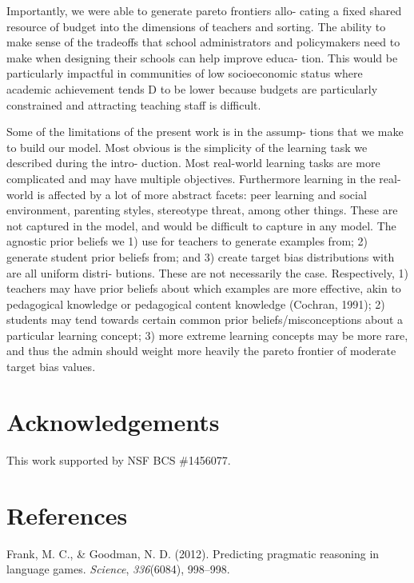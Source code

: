 \documentclass[10pt, letterpaper]{article}
\begin{document}
Importantly, we were able to generate pareto frontiers allo- cating a
fixed shared resource of budget into the dimensions of teachers and
sorting. The ability to make sense of the tradeoffs that school
administrators and policymakers need to make when designing their
schools can help improve educa- tion. This would be particularly
impactful in communities of low socioeconomic status where academic
achievement tends D to be lower because budgets are particularly
constrained and attracting teaching staff is difficult.

Some of the limitations of the present work is in the assump- tions that
we make to build our model. Most obvious is the simplicity of the
learning task we described during the intro- duction. Most real-world
learning tasks are more complicated and may have multiple objectives.
Furthermore learning in the real-world is affected by a lot of more
abstract facets: peer learning and social environment, parenting styles,
stereotype threat, among other things. These are not captured in the
model, and would be difficult to capture in any model. The agnostic
prior beliefs we 1) use for teachers to generate examples from; 2)
generate student prior beliefs from; and 3) create target bias
distributions with are all uniform distri- butions. These are not
necessarily the case. Respectively, 1) teachers may have prior beliefs
about which examples are more effective, akin to pedagogical knowledge
or pedagogical content knowledge (Cochran, 1991); 2) students may tend
towards certain common prior beliefs/misconceptions about a particular
learning concept; 3) more extreme learning concepts may be more rare,
and thus the admin should weight more heavily the pareto frontier of
moderate target bias values.

\section{Acknowledgements}\label{acknowledgements}

This work supported by NSF BCS \#1456077.

\section{References}\label{references}

\setlength{\parindent}{-0.1in} \setlength{\leftskip}{0.125in} \noindent

\hypertarget{refs}{}
\hypertarget{ref-frank2012}{}
Frank, M. C., \& Goodman, N. D. (2012). Predicting pragmatic reasoning
in language games. \emph{Science}, \emph{336}(6084), 998--998.
\end{document}
